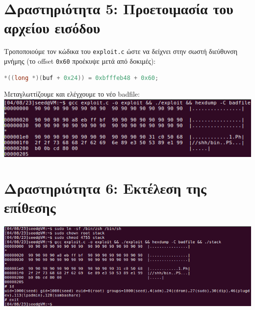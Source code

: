 \documentclass[12pt]{article}
\begin{document}
\section{Δραστηριότητα 5: Προετοιμασία του αρχείου εισόδου}

Τροποποιούμε τον κώδικα του \lstinline{exploit.c} ώστε να δείχνει στην σωστή
διεύθυνση μνήμης (το offset \lstinline{0x60} προέκυψε μετά από δοκιμές):

\begin{lstlisting}[language=C]
	*((long *)(buf + 0x24)) = 0xbfffeb48 + 0x60;
\end{lstlisting}

Μεταγλωττίζουμε και ελέγχουμε το νέο badfile: \\

\includegraphics[width=\textwidth]{res/offset.png} \\

\section{Δραστηριότητα 6: Εκτέλεση της επίθεσης}

\includegraphics[width=\textwidth]{res/attack.png} \\
\end{document}

